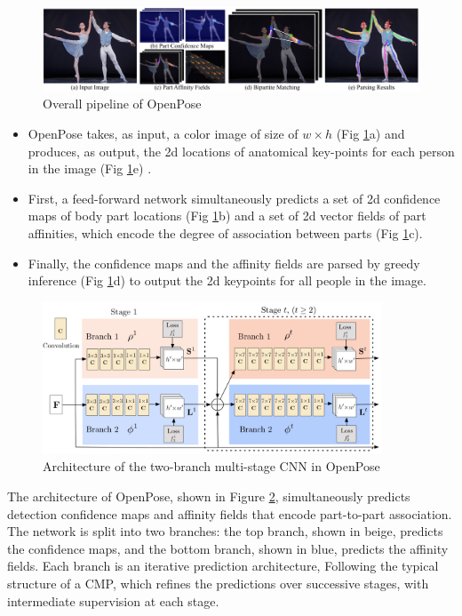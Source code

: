 \begin{figure}[htbp]
\centering\includegraphics[scale=0.325]{./img/paf.png}
  \caption[Overall pipeline of OpenPose]{Overall pipeline of OpenPose \cite{cao2017realtime}}\label{fig:paf}
\end{figure}

\begin{itemize}
\item OpenPose takes, as input, a color image of size of $w \times h$ (Fig \ref{fig:paf}a) and produces, as output, the 2d locations of anatomical key-points for each person in the image (Fig \ref{fig:paf}e) \cite{cao2017realtime}.
\item First, a feed-forward network simultaneously predicts a set of 2d confidence maps of body part locations (Fig \ref{fig:paf}b) and a set of 2d vector fields of part affinities, which encode the degree of association between parts (Fig \ref{fig:paf}c).
\item Finally, the confidence maps and the affinity fields are parsed by greedy inference (Fig \ref{fig:paf}d) to output the 2d keypoints for all people in the image.
\end{itemize}

\begin{figure}[htbp]
\centering\includegraphics[width=0.9\textwidth]{./img/OpenPoseArchitecture.png}
  \caption[Architecture of the two-branch multi-stage CNN in OpenPose]{Architecture of the two-branch multi-stage CNN in OpenPose \cite{cao2017realtime}}\label{fig:architecture}
\end{figure}

\par The architecture of OpenPose, shown in Figure \ref{fig:architecture}, simultaneously predicts detection confidence maps and affinity fields that encode part-to-part association. The network is split into two branches: the top branch, shown in beige, predicts the confidence maps, and the bottom branch, shown in blue, predicts the affinity fields. Each branch is an iterative prediction architecture, Following the typical structure of a CMP, which refines the predictions over successive stages, with intermediate supervision at each stage.

